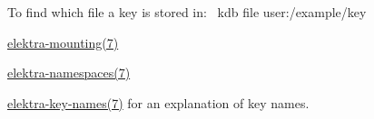 To find which file a key is stored in\+:~\newline
 {\ttfamily kdb file user\+:/example/key}~\newline



\begin{DoxyItemize}
\item \hyperlink{doc_help_elektra-mounting_md}{elektra-\/mounting(7)}
\item \hyperlink{doc_help_elektra-namespaces_md}{elektra-\/namespaces(7)}
\item \hyperlink{doc_help_elektra-key-names_md}{elektra-\/key-\/names(7)} for an explanation of key names. 
\end{DoxyItemize}